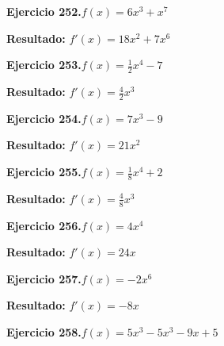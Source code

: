 \documentclass[10pt,a4paper]{article}
\begin{document}
\begin{ejbox}
\textbf{Ejercicio 252.}\quad $f(x) = 6x^{3} + x^{7}$
\end{ejbox}

\begin{solbox}
\textbf{Resultado:} \(\displaystyle f'(x) = 18x^{2} + 7x^{6}\)
\end{solbox}

\newpage
\begin{ejbox}
\textbf{Ejercicio 253.}\quad $f(x) = \frac{1}{2}x^{4} -7$
\end{ejbox}

\begin{solbox}
\textbf{Resultado:} \(\displaystyle f'(x) = \frac{4}{2}x^{3}\)
\end{solbox}

\begin{ejbox}
\textbf{Ejercicio 254.}\quad $f(x) = 7x^{3} -9$
\end{ejbox}

\begin{solbox}
\textbf{Resultado:} \(\displaystyle f'(x) = 21x^{2}\)
\end{solbox}

\begin{ejbox}
\textbf{Ejercicio 255.}\quad $f(x) = \frac{1}{8}x^{4} +2$
\end{ejbox}

\begin{solbox}
\textbf{Resultado:} \(\displaystyle f'(x) = \frac{4}{8}x^{3}\)
\end{solbox}

\newpage
\begin{ejbox}
\textbf{Ejercicio 256.}\quad $f(x) = 4x^{4}$
\end{ejbox}

\begin{solbox}
\textbf{Resultado:} \(\displaystyle f'(x) = 24x\)
\end{solbox}

\begin{ejbox}
\textbf{Ejercicio 257.}\quad $f(x) = -2x^{6}$
\end{ejbox}

\begin{solbox}
\textbf{Resultado:} \(\displaystyle f'(x) = -8x\)
\end{solbox}

\begin{ejbox}
\textbf{Ejercicio 258.}\quad $f(x) = 5x^{3} -5x^{3} -9x +5$
\end{ejbox}
\end{document}
